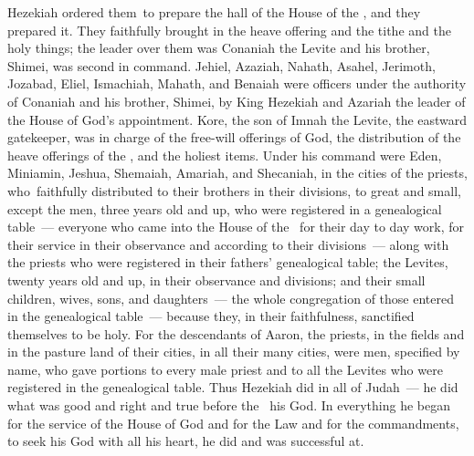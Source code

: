 \begin{inparaenum}
   Hezekiah ordered them\understood\ to prepare the hall of the House of the \lord, and they prepared it.\understood%
   They faithfully brought in the heave offering and the tithe and the holy things; the leader over them was Conaniah the Levite and his brother, Shimei, was second in command.\understood%
   Jehiel, Azaziah, Nahath, Asahel, Jerimoth, Jozabad, Eliel, Ismachiah, Mahath, and Benaiah were officers under the authority of Conaniah and his brother, Shimei, by King Hezekiah and Azariah the leader of the House of God's appointment.%
   Kore, the son of Imnah the Levite, the eastward gatekeeper, was in charge of the free-will offerings of God, the distribution of the heave offerings of the \lord, and the holiest items.%
   Under his command were Eden, Miniamin, Jeshua, Shemaiah, Amariah, and Shecaniah, in the cities of the priests, who\understood\ faithfully distributed to their brothers in their divisions, to great and small,%
   except the men, three years old and up, who were registered in a genealogical table~--- everyone who came into the House of the \lord\ for their day to day work, for their service in their observance and according to their divisions~---%
   along with the priests who were registered in their fathers' genealogical table; the Levites, twenty years old and up, in their observance and divisions;%
   and their small children, wives, sons, and daughters~--- the whole congregation of those entered in the genealogical table~--- because they, in their faithfulness, sanctified themselves to be holy.%
   For the descendants of Aaron, the priests, in the fields and in the pasture land of their cities, in all their many cities, were men, specified by name, who gave portions to every male priest and to all the Levites who were registered in the genealogical table.%
   Thus Hezekiah did in all of Judah~--- he did what was good and right and true before the \lord\ his God.%
   In everything he began for the service of the House of God and for the Law and for the commandments, to seek his God with all his heart, he did and was successful at.\understood%
\end{inparaenum}
